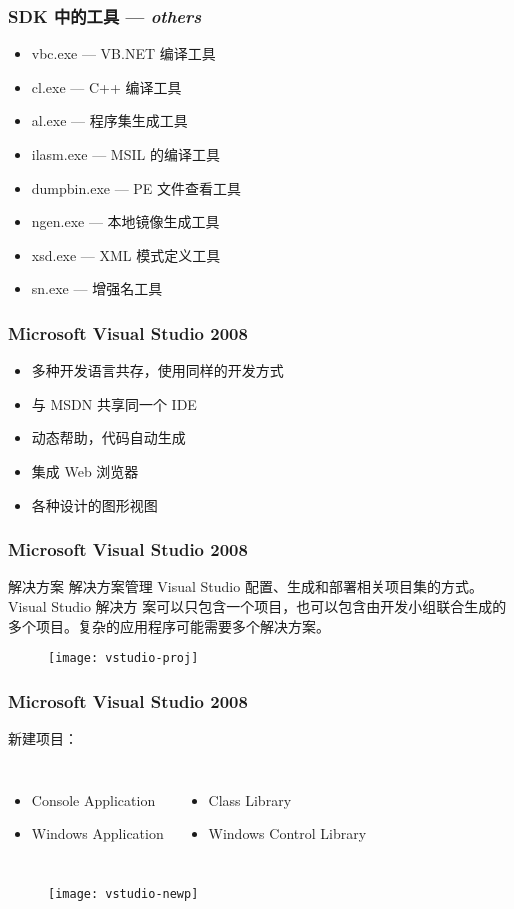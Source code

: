 \begin{frame}
\frametitle{SDK 中的工具 --- \textit{others}}

\begin{itemize}
    \setlength{\itemsep}{6pt plus 1pt}
\item vbc.exe --- VB.NET 编译工具
\item cl.exe  --- C++ 编译工具
\item al.exe  --- 程序集生成工具
\item ilasm.exe --- MSIL 的编译工具
\item dumpbin.exe --- PE 文件查看工具
\item ngen.exe --- 本地镜像生成工具
\item xsd.exe --- XML 模式定义工具
\item sn.exe --- 增强名工具
\end{itemize}
\end{frame}

\begin{frame}
\frametitle{Microsoft Visual Studio 2008}
\begin{itemize}
    \setlength{\itemsep}{8pt plus 1pt}
\item 多种开发语言共存，使用同样的开发方式
\item 与 MSDN 共享同一个 IDE
\item 动态帮助，代码自动生成
\item 集成 Web 浏览器
\item 各种设计的图形视图
\end{itemize}
\end{frame}

\begin{frame}
\frametitle{Microsoft Visual Studio 2008}
\begin{block}{解决方案}
  \CJKindent \small 解决方案管理 Visual Studio 配置、生成和部署相关项目集的方式。Visual Studio 解决方
  案可以只包含一个项目，也可以包含由开发小组联合生成的多个项目。复杂的应用程序可能需要多个解决方案。
\end{block}
\begin{figure}
  \centering
\texttt{[image: vstudio-proj]}
\end{figure}
\end{frame}

\begin{frame}
\frametitle{Microsoft Visual Studio 2008}
新建项目：
\begin{columns}
  \begin{itemize}
  \item Console Application
  \item Windows Application
  \end{itemize}
  \begin{itemize}
  \item Class Library
  \item Windows Control Library
  \end{itemize}
\end{columns}
\begin{figure}
  \centering
  \texttt{[image: vstudio-newp]}
\end{figure}
\end{frame}

